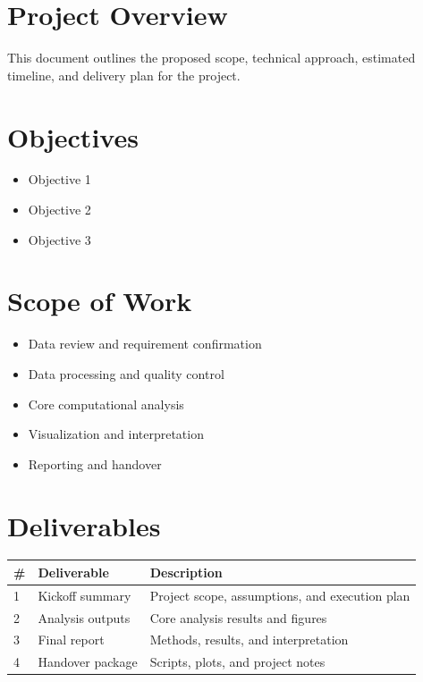 \documentclass[11pt,a4paper]{article}
\begin{document}
\CambiumTitlePage

\section{Project Overview}
This document outlines the proposed scope, technical approach, estimated timeline, and delivery plan for the project.

\section{Objectives}
\begin{itemize}[leftmargin=1.5em]
    \item Objective 1
    \item Objective 2
    \item Objective 3
\end{itemize}

\section{Scope of Work}
\begin{itemize}[leftmargin=1.5em]
    \item Data review and requirement confirmation
    \item Data processing and quality control
    \item Core computational analysis
    \item Visualization and interpretation
    \item Reporting and handover
\end{itemize}

\section{Deliverables}
\begin{longtable}{p{0.8cm}p{5cm}p{8.5cm}}
\toprule
\textbf{\#} & \textbf{Deliverable} & \textbf{Description} \\
\midrule
1 & Kickoff summary & Project scope, assumptions, and execution plan \\
2 & Analysis outputs & Core analysis results and figures \\
3 & Final report & Methods, results, and interpretation \\
4 & Handover package & Scripts, plots, and project notes \\
\bottomrule
\end{longtable}
\end{document}
